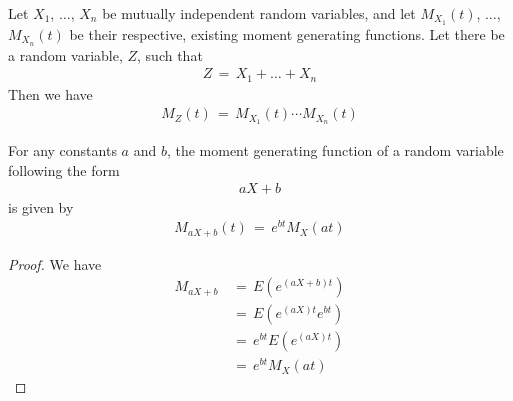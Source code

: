 \begin{theorem}
    Let $X_{1}$, $\dots$, $X_{n}$ be mutually independent random variables, and let $M_{X_{1}}(t)$, $\dots$, $M_{X_{n}}(t)$ be their respective, existing moment generating functions. Let there be a random variable, $Z$, such that
    \begin{align*}
        Z \hspace{2pt} = \hspace{2pt} X_{1} + \dots + X_{n}
    \end{align*}
    Then we have
    \begin{align*}
        M_{Z}(t) \hspace{2pt} = \hspace{2pt} M_{X_{1}}(t) \cdots M_{X_{n}}(t)
    \end{align*}
\end{theorem}

\begin{theorem}
    For any constants $a$ and $b$, the moment generating function of a random variable following the form
    \begin{align*}
        aX + b
    \end{align*}
    is given by
    \begin{align*}
        M_{aX + b}(t) \hspace{2pt} = \hspace{2pt} e^{bt} M_{X}(at)
    \end{align*}
    \begin{proof}
        We have
        \begin{align*}
            M_{aX + b} \hspace{2pt} &= \hspace{2pt} E(e^{(aX + b)t}) \\[1ex]
            &= \hspace{2pt} E(e^{(aX)t} e^{bt}) \\[1ex]
            &= \hspace{2pt} e^{bt} E(e^{(aX)t}) \\[1ex]
            &= \hspace{2pt} e^{bt} M_{X}(at)
        \end{align*}
    \end{proof}
\end{theorem}